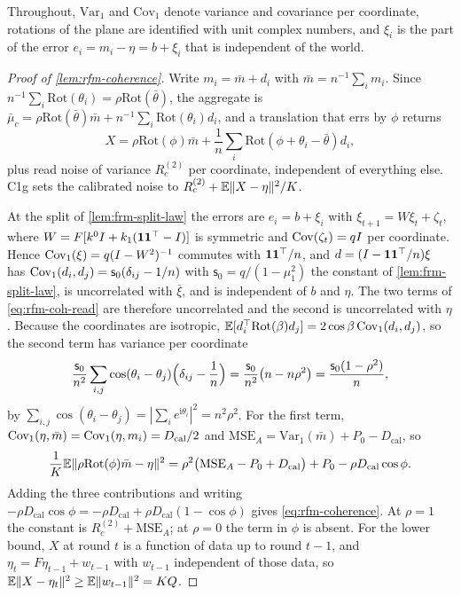 Throughout, $\mathrm{Var}_1$ and $\mathrm{Cov}_1$ denote variance and covariance per coordinate, rotations of the plane are identified with unit complex numbers, and $\xi_i$ is the part of the error $e_i=m_i-\eta=b+\xi_i$ that is independent of the world.

\begin{proof}[Proof of \cref{lem:rfm-coherence}]
Write $m_i=\bar m+d_i$ with $\bar m=n^{-1}\sum_im_i$. Since $n^{-1}\sum_i\mathrm{Rot}(\theta_i)=\rho\mathrm{Rot}(\bar\theta)$, the aggregate is $\bar\mu_c=\rho\mathrm{Rot}(\bar\theta)\bar m+n^{-1}\sum_i\mathrm{Rot}(\theta_i)d_i$, and a translation that errs by $\phi$ returns
\begin{equation}\label{eq:rfm-coh-read}
X=\rho\mathrm{Rot}(\phi)\bar m+\frac1n\sum_i\mathrm{Rot}(\phi+\theta_i-\bar\theta)d_i,
\end{equation}
plus read noise of variance $R_c^{(2)}$ per coordinate, independent of everything else. C1g sets the calibrated noise to $R_c^{(2)}+\mathbb{E}\|X-\eta\|^2/K$.

At the split of \cref{lem:frm-split-law} the errors are $e_i=b+\xi_i$ with $\xi_{t+1}=W\xi_t+\zeta_t$, where $W=F[k^0I+k_1(\mathbf{1}\mathbf{1}^\top-I)]$ is symmetric and $\operatorname{Cov}(\zeta_t)=qI$ per coordinate. Hence $\operatorname{Cov}_1(\xi)=q(I-W^2)^{-1}$ commutes with $\mathbf{1}\mathbf{1}^\top/n$, and $d=(I-\mathbf{1}\mathbf{1}^\top/n)\xi$ has $\operatorname{Cov}_1(d_i,d_j)=\mathsf s_0(\delta_{ij}-1/n)$ with $\mathsf s_0=q/(1-\mu_1^2)$ the constant of \cref{lem:frm-split-law}, is uncorrelated with $\bar\xi$, and is independent of $b$ and $\eta$. The two terms of \eqref{eq:rfm-coh-read} are therefore uncorrelated and the second is uncorrelated with $\eta$. Because the coordinates are isotropic, $\mathbb{E}[d_i^\top\mathrm{Rot}(\beta)d_j]=2\cos\beta\operatorname{Cov}_1(d_i,d_j)$, so the second term has variance per coordinate
\begin{equation*}
\frac{\mathsf s_0}{n^2}\sum_{i,j}\cos(\theta_i-\theta_j)\Bigl(\delta_{ij}-\frac1n\Bigr)=\frac{\mathsf s_0}{n^2}\bigl(n-n\rho^2\bigr)=\frac{\mathsf s_0(1-\rho^2)}n,
\end{equation*}
by $\sum_{i,j}\cos(\theta_i-\theta_j)=|\sum_ie^{\mathrm i\theta_i}|^2=n^2\rho^2$. For the first term, $\operatorname{Cov}_1(\eta,\bar m)=\operatorname{Cov}_1(\eta,m_i)=D_{\mathrm{cal}}/2$ and $\mathrm{MSE}_A=\mathrm{Var}_1(\bar m)+P_0-D_{\mathrm{cal}}$, so
\begin{equation*}
\frac1K\mathbb{E}\|\rho\mathrm{Rot}(\phi)\bar m-\eta\|^2=\rho^2\bigl(\mathrm{MSE}_A-P_0+D_{\mathrm{cal}}\bigr)+P_0-\rho D_{\mathrm{cal}}\cos\phi.
\end{equation*}
Adding the three contributions and writing $-\rho D_{\mathrm{cal}}\cos\phi=-\rho D_{\mathrm{cal}}+\rho D_{\mathrm{cal}}(1-\cos\phi)$ gives \eqref{eq:rfm-coherence}. At $\rho=1$ the constant is $R_c^{(2)}+\mathrm{MSE}_A$; at $\rho=0$ the term in $\phi$ is absent. For the lower bound, $X$ at round $t$ is a function of data up to round $t-1$, and $\eta_t=F\eta_{t-1}+w_{t-1}$ with $w_{t-1}$ independent of those data, so $\mathbb{E}\|X-\eta_t\|^2\ge\mathbb{E}\|w_{t-1}\|^2=KQ$.
\end{proof}

